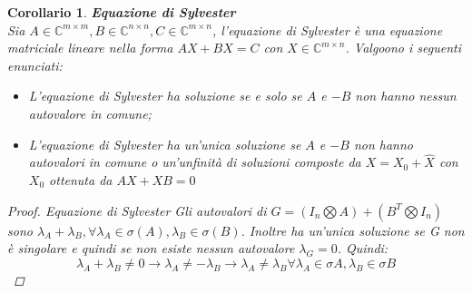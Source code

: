 \documentclass{article}
\newtheorem{corollary}{\textbf{Corollario}}
\theoremstyle{definition}
\begin{document}
\begin{corollary}{\textbf{Equazione di Sylvester}}\\
    Sia \(A\in\mathbb{C}^{m\times m},B\in\mathbb{C}^{n\times n},C\in\mathbb{C}^{m\times n}\), l'equazione di Sylvester è una equazione matriciale lineare nella forma \(AX+BX=C\) con \(X\in\mathbb{C}^{m\times n}\). Valgoono i seguenti enunciati:\begin{itemize}
        \item L'equazione di Sylvester ha soluzione se e solo se \(A\) e \(-B\) non hanno nessun autovalore in comune;
        \item L'equazione di Sylvester ha un'unica soluzione se \(A\) e \(-B\) non hanno autovalori in comune o un'unfinità di soluzioni composte da \(X=X_{0}+\hat{X}\) con \(X_{0}\) ottenuta da \(AX+XB=0\)
    \end{itemize}
    \begin{proof}{Equazione di Sylvester}
        Gli autovalori di \(G=(I_{n}\bigotimes A)+(B^{T}\bigotimes I_{n})\) sono \(\lambda_{A}+\lambda_{B},\forall \lambda_{A}\in\sigma{(A)},\lambda_{B}\in\sigma{(B)}\). Inoltre ha un'unica soluzione se G non è singolare e quindi se non esiste nessun autovalore \(\lambda_{G}=0\). Quindi:
        \begin{equation*}
            \lambda_{A}+\lambda_{B}\neq 0\rightarrow \lambda_{A}\neq-\lambda_{B}\rightarrow \lambda_{A}\neq\lambda_{B}\forall \lambda_{A}\in\sigma{A},\lambda_{B}\in\sigma{B}
        \end{equation*}
    \end{proof}
\end{corollary}
\end{document}
